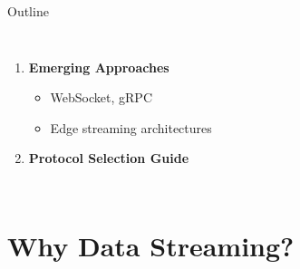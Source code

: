 \documentclass[aspectratio=169,11pt]{beamer}
\begin{document}
\begin{frame}{Outline}
\begin{columns}
\begin{enumerate}
            \item \textbf{Emerging Approaches}
            \begin{itemize}
                \item WebSocket, gRPC
                \item Edge streaming architectures
            \end{itemize}
            
            \item \textbf{Protocol Selection Guide}
        \end{enumerate}
    \end{columns}
\end{frame}

\section{Why Data Streaming?}
\end{document}
